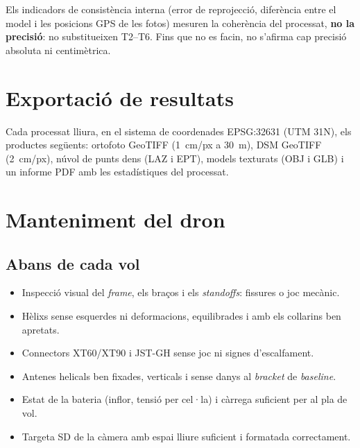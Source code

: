 Els indicadors de consistència interna (error de reprojecció, diferència entre el model i les posicions GPS de les fotos) mesuren la coherència del processat, \textbf{no la precisió}: no substitueixen T2--T6. Fins que no es facin, no s'afirma cap precisió absoluta ni centimètrica.

\section{Exportació de resultats}
\label{sec:exportacio}

Cada processat lliura, en el sistema de coordenades EPSG:32631 (UTM 31N), els productes següents: ortofoto GeoTIFF (1~cm/px a 30~m), DSM GeoTIFF (2~cm/px), núvol de punts dens (LAZ i EPT), models texturats (OBJ i GLB) i un informe PDF amb les estadístiques del processat.

\section{Manteniment del dron}
\label{sec:manteniment}

\subsection{Abans de cada vol}
\begin{itemize}
    \item Inspecció visual del \emph{frame}, els braços i els \emph{standoffs}: fissures o joc mecànic.
    \item Hèlixs sense esquerdes ni deformacions, equilibrades i amb els collarins ben apretats.
    \item Connectors XT60/XT90 i JST-GH sense joc ni signes d'escalfament.
    \item Antenes helicals ben fixades, verticals i sense danys al \emph{bracket} de \emph{baseline}.
    \item Estat de la bateria (inflor, tensió per cel·la) i càrrega suficient per al pla de vol.
    \item Targeta SD de la càmera amb espai lliure suficient i formatada correctament.
\end{itemize}

